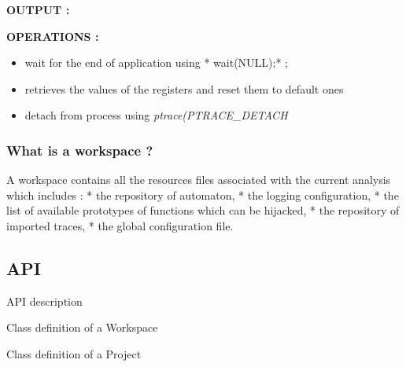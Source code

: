 \documentclass[letterpaper,10pt,english]{sphinxmanual}
\begin{document}
\textbf{OUTPUT :}

\textbf{OPERATIONS :}
\begin{itemize}
\item {} 
wait for the end of application using * wait(NULL);* ;

\item {} 
retrieves the values of the registers and reset them to default ones

\item {} 
detach from process using \emph{ptrace(PTRACE\_DETACH}

\end{itemize}


\subsubsection{What is a workspace ?}
\label{Annexes/index:what-is-a-workspace}
A workspace contains all the resources files associated with the current analysis which includes :
* the repository of automaton,
* the logging configuration,
* the list of available prototypes of functions which can be hijacked,
* the repository of imported traces,
* the global configuration file.


\subsection{API}
\label{API/index:api}\label{API/index::doc}\label{API/index:id1}
API description
\label{API/index:module-netzob.Common.Workspace}

\begin{fulllineitems}
\label{API/index:netzob.Common.Workspace.Workspace}
Class definition of a Workspace

\end{fulllineitems}

\label{API/index:module-netzob.Common.Project}

\begin{fulllineitems}
\label{API/index:netzob.Common.Project.Project}
Class definition of a Project

\end{fulllineitems}
\end{document}
